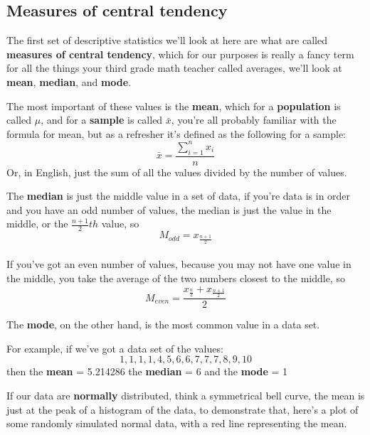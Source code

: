 \documentclass[
]{article}
\begin{document}
\hypertarget{measures-of-central-tendency}{%
\subsection{Measures of central
tendency}\label{measures-of-central-tendency}}

The first set of descriptive statistics we'll look at here are what are
called \textbf{measures of central tendency}, which for our purposes is
really a fancy term for all the things your third grade math teacher
called averages, we'll look at \textbf{mean}, \textbf{median}, and
\textbf{mode}.

The most important of these values is the \textbf{mean}, which for a
\textbf{population} is called \(\mu\), and for a \textbf{sample} is
called \(\bar{x}\), you're all probably familiar with the formula for
mean, but as a refresher it's defined as the following for a sample:\\
\[ \bar{x} = \frac{\sum_{i=1}^n x_i}{n} \] Or, in English, just the sum
of all the values divided by the number of values.

The \textbf{median} is just the middle value in a set of data, if you're
data is in order and you have an odd number of values, the median is
just the value in the middle, or the \(\frac{n+1}{2}th\) value, so
\[ M_{odd} = x_\frac{n+1}{2}\]\\
If you've got an even number of values, because you may not have one
value in the middle, you take the average of the two numbers closest to
the middle, so \[M_{even} = \frac{x_\frac{n}{2}+x_\frac{n+1}{2}}{2}\]

The \textbf{mode}, on the other hand, is the most common value in a data
set.

For example, if we've got a data set of the values:
\[1,1,1,1,4,5,6,6,7,7,7,8,9,10\] then the \textbf{mean} = 5.214286 the
\textbf{median} = 6 and the \textbf{mode} = 1

If our data are \textbf{normally} distributed, think a symmetrical bell
curve, the mean is just at the peak of a histogram of the data, to
demonstrate that, here's a plot of some randomly simulated normal data,
with a red line representing the mean.
\end{document}
